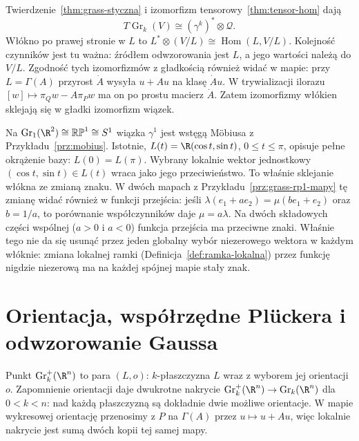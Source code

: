 \begin{uwaga}
Twierdzenie~\ref{thm:grass-styczna} i
izomorfizm tensorowy~\ref{thm:tensor-hom} dają
\[
 T\operatorname{Gr}_k(V)\cong
       (\gamma^k)^*\otimes\mathcal Q.
\]
Włókno po prawej stronie w $L$ to
$L^*\otimes(V/L)\cong\operatorname{Hom}(L,V/L)$.
Kolejność czynników jest tu ważna: źródłem odwzorowania
jest $L$, a jego wartości należą do $V/L$.
Zgodność tych izomorfizmów z gładkością również widać w mapie:
przy $L=\Gamma(A)$ przyrost $\dot A$ wysyła $u+Au$ na
klasę $\dot A u$. W trywializacji ilorazu
$[w]\mapsto\pi_Qw-A\pi_Pw$ ma on po prostu macierz $\dot A$.
Zatem izomorfizmy włókien sklejają się w gładki izomorfizm wiązek.
\end{uwaga}

\begin{przyklad}
Na $\operatorname{Gr}_1(\R^2)\cong\mathbb{RP}^1\cong S^1$
wiązka $\gamma^1$ jest wstęgą Möbiusa z
Przykładu~\ref{prz:mobius}. Istotnie,
$L(t)=\R(\cos t,\sin t)$, $0\leq t\leq\pi$,
opisuje pełne okrążenie bazy: $L(0)=L(\pi)$.
Wybrany lokalnie wektor jednostkowy
$(\cos t,\sin t)\in L(t)$ wraca jako jego
przeciwieństwo. To właśnie sklejanie włókna
ze zmianą znaku.
W dwóch mapach z Przykładu~\ref{prz:grass-rp1-mapy} tę zmianę
widać również w funkcji przejścia: jeśli
$\lambda(e_1+ae_2)=\mu(be_1+e_2)$ oraz $b=1/a$,
to porównanie współczynników daje $\mu=a\lambda$.
Na dwóch składowych części wspólnej ($a>0$ i $a<0$)
funkcja przejścia ma przeciwne znaki. Właśnie tego
nie da się usunąć przez jeden globalny wybór
niezerowego wektora w każdym włóknie: zmiana
lokalnej ramki (Definicja~\ref{def:ramka-lokalna})
przez funkcję nigdzie niezerową
ma na każdej spójnej mapie stały znak.
\end{przyklad}

\section{Orientacja, współrzędne Plückera i odwzorowanie Gaussa}
\label{sec:grass-plucker}

\begin{definicja}
Punkt $\operatorname{Gr}^+_k(\R^n)$ to para $(L,o)$:
$k$-płaszczyzna $L$ wraz z wyborem jej orientacji $o$.
Zapomnienie orientacji daje dwukrotne nakrycie
$\operatorname{Gr}^+_k(\R^n)\to\operatorname{Gr}_k(\R^n)$
dla $0<k<n$: nad każdą płaszczyzną są dokładnie
dwie możliwe orientacje. W mapie wykresowej
orientację przenosimy z $P$ na $\Gamma(A)$ przez
$u\mapsto u+Au$, więc lokalnie nakrycie jest
sumą dwóch kopii tej samej mapy.
\end{definicja}

